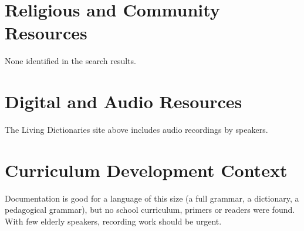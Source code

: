 \documentclass[12pt]{article}
\begin{document}
\section{Religious and Community Resources}
None identified in the search results.

\section{Digital and Audio Resources}
The Living Dictionaries site above includes audio recordings by speakers.

\section{Curriculum Development Context}
Documentation is good for a language of this size (a full grammar, a dictionary, a pedagogical grammar), but no school curriculum, primers or readers were found. With few elderly speakers, recording work should be urgent.
\end{document}

